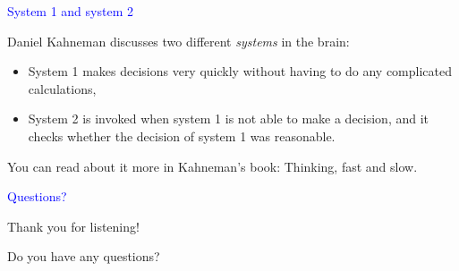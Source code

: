 \documentclass{slides}
\newcommand{\ti}[1]{\begin{center}\Large{\textcolor{blue}{#1}}\end{center}}
\begin{document}
\begin{slide}\ti{System 1 and system 2}

Daniel Kahneman discusses two different \emph{systems} in the brain:

\begin{itemize}
\item System 1 makes decisions very quickly without having to do any
  complicated calculations,
\item System 2 is invoked when system 1 is not able to make a
  decision, and it checks whether the decision of system 1 was
  reasonable.
\end{itemize}

You can read about it more in Kahneman's book: Thinking, fast and
slow.

\vfill\end{slide}
\begin{slide}\ti{Questions?}

Thank you for listening!

Do you have any questions?

\vfill\end{slide}



\end{document}

